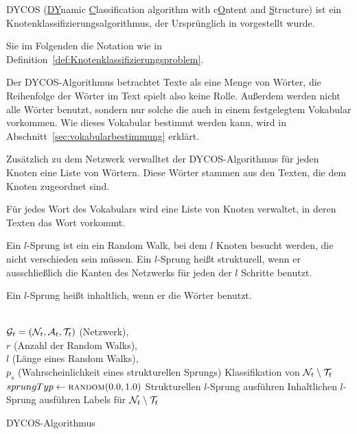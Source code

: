 DYCOS (\underline{DY}namic \underline{C}lassification 
algorithm with c\underline{O}ntent and \underline{S}tructure) ist ein 
Knotenklassifizierungsalgorithmus, der Ursprünglich in \cite{aggarwal2011} vorgestellt 
wurde.

Sie im Folgenden die Notation wie in Definition~\ref{def:Knotenklassifizierungsproblem}.

Der DYCOS-Algorithmus betrachtet Texte als eine Menge von Wörter, 
die Reihenfolge der Wörter im Text spielt also keine Rolle. Außerdem
werden nicht alle Wörter benutzt, sondern nur solche die auch in 
einem festgelegtem Vokabular vorkommen. Wie dieses Vokabular bestimmt
werden kann, wird in Abschnitt~\ref{sec:vokabularbestimmung} erklärt.

Zusätzlich zu dem Netzwerk verwalltet der DYCOS-Algorithmus für jeden
Knoten eine Liste von Wörtern. Diese Wörter stammen aus den Texten,
die dem Knoten zugeordnet sind.

Für jedes Wort des Vokabulars wird eine Liste von Knoten verwaltet, 
in deren Texten das Wort vorkommt.

Ein $l$-Sprung ist ein ein Random Walk, bei dem $l$
Knoten besucht werden, die nicht verschieden sein müssen. Ein 
$l$-Sprung heißt strukturell, wenn er ausschließlich die Kanten
des Netzwerks für jeden der $l$ Schritte benutzt.

Ein $l$-Sprung heißt inhaltlich, wenn er die Wörter benutzt.

\begin{algorithm}[h]
    \begin{algorithmic}
        \Require \\$\mathcal{G}_t = (\mathcal{N}_t, \mathcal{A}_t, \mathcal{T}_t)$ (Netzwerk),\\
                 $r$ (Anzahl der Random Walks),\\
                 $l$ (Länge eines Random Walks),\\
                 $p_s$ (Wahrscheinlichkeit eines strukturellen Sprungs)
        \Ensure  Klassifikation von $\mathcal{N}_t \setminus \mathcal{T}_t$\\

                \State $sprungTyp \gets \Call{random}{0.0, 1.0}$
                    \State Strukturellen $l$-Sprung ausführen
                \Else
                    \State Inhaltlichen $l$-Sprung ausführen
                \EndIf
            \EndFor
        \EndFor
        \State \Return Labels für $\mathcal{N}_t \setminus \mathcal{T}_t$
    \end{algorithmic}
\caption{DYCOS-Algorithmus}
\label{alg:DYCOS}
\end{algorithm}

